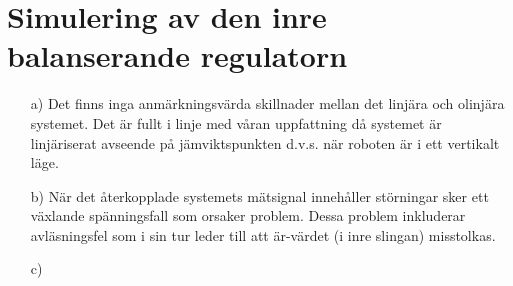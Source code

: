 \documentclass[11pt]{article}
\begin{document}
\section{Simulering av den inre balanserande regulatorn}\vspace*{1em}
\begin{enumerate}
\item[a)] Det finns inga anmärkningsvärda skillnader mellan det linjära och olinjära systemet. Det är fullt i linje med våran uppfattning då systemet är linjäriserat avseende på jämviktspunkten d.v.s. när roboten är i ett vertikalt läge.
\item[b)] När det återkopplade systemets mätsignal innehåller störningar sker ett växlande spänningsfall som orsaker problem. Dessa problem inkluderar avläsningsfel som i sin tur leder till att är-värdet (i inre slingan) misstolkas.
\item[c)] 
\end{enumerate}
\newpage
\end{document}
